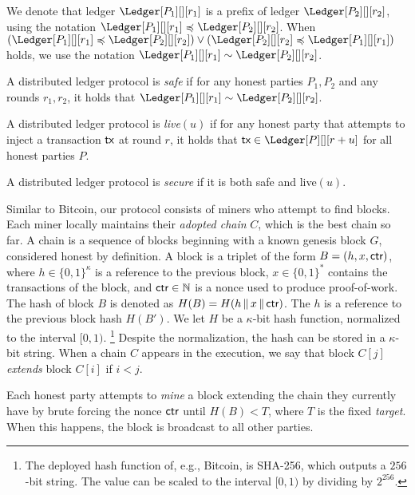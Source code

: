 We denote that ledger
$\Ledger[P_1][][r_1]$ is a prefix of ledger $\Ledger[P_2][][r_2]$,
using the notation
$\Ledger[P_1][][r_1] \preccurlyeq \Ledger[P_2][][r_2]$. When
$(\Ledger[P_1][][r_1] \preccurlyeq \Ledger[P_2][][r_2]) \lor (\Ledger[P_2][][r_2] \preccurlyeq \Ledger[P_1][][r_1])$ holds,
we use the notation $\Ledger[P_1][][r_1] \sim \Ledger[P_2][][r_2]$.

\begin{definition}[Safety]
  A distributed ledger protocol is \emph{safe} if
  for any honest parties $P_1, P_2$ and any rounds $r_1, r_2$, it holds that
  $\Ledger[P_1][][r_1] \sim \Ledger[P_2][][r_2]$.
\end{definition}

\begin{definition}[Liveness]
  A distributed ledger protocol is \emph{live}$(u)$ if
  for any honest party that attempts to inject a transaction $\textsf{tx}$
  at round $r$, it holds that $\tx \in \Ledger[P][][r+u]$
  for all honest parties $P$.
\end{definition}

\begin{definition}[Security]
  A distributed ledger protocol is \emph{secure} if it is
  both safe and live$(u)$.
\end{definition}

\noindent
{}
Similar to Bitcoin, our protocol consists of miners who attempt to find blocks.
Each miner locally maintains their \emph{adopted chain} $C$, which is the best
chain so far. A chain is a sequence of blocks beginning with a known genesis block $G$,
considered honest by definition.
A block is a triplet of the
form $B = (h, x, \textsf{ctr})$, where $h \in \{0,1\}^\kappa$ is a reference to the previous block,
$x \in \{0, 1\}^*$ contains the transactions of the block, and $\textsf{ctr} \in \mathbb{N}$ is a nonce
used to produce proof-of-work.
The hash of block $B$ is denoted as $H(B) = H(h \,\|\, x \,\|\, \textsf{ctr})$.
The $h$ is a reference to the previous block hash $H(B')$.
We let $H$ be a $\kappa$-bit hash function, normalized to the interval
$[0, 1)$.
\footnote{The deployed hash function of, e.g., Bitcoin,
is SHA-256, which outputs a $256$-bit string. The value can be scaled to the interval
$[0, 1)$ by dividing by $2^{256}$.}
Despite the normalization, the hash can be stored in a $\kappa$-bit string.
When a chain $C$ appears in the execution, we say that block $C[j]$ \emph{extends} block $C[i]$
if $i < j$.

Each honest party attempts to \emph{mine} a block extending the chain they currently have
by brute forcing the nonce $\textsf{ctr}$ until $H(B) < T$, where $T$ is the fixed \emph{target}.
When this happens, the block is broadcast to all other parties.

